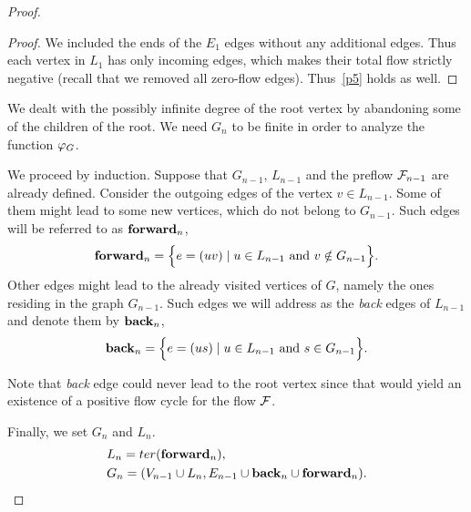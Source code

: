 \documentclass[12pt,oneside,a4paper]{amsart}
\begin{document}
\begin{proof}
\begin{proof}
          We included the ends of the $E_1$ edges without any additional edges.
          Thus each vertex in $L_1$ has only incoming edges, which makes their
            total flow strictly negative (recall that we removed all zero-flow edges).
          Thus~\ref{p5} holds as well.
        \end{proof}
        \begin{remark}
          We dealt with the possibly infinite degree of the root vertex by abandoning some of the children of the root.
          We need $G_n$ to be finite in order to analyze the function $\varphi_{G}$.
        \end{remark}

        We proceed by induction.
        Suppose that $G_{n-1}$, $L_{n-1}$ and the preflow $\mathcal{F}_{n-1}$ are already defined.
        Consider the outgoing edges of the vertex $v \in L_{n-1}$.
        Some of them might lead to some new vertices, which do not belong to $G_{n-1}$.
        Such edges will be referred to as $\mathbf{forward}_n$,
        \[
          \mathbf{forward}_n = \Big\{ e = (uv) \mid u \in L_{n-1} \text{ and } v \notin G_{n-1}\Big\}.
        \]
        Other edges might lead to the already visited vertices of $G$, namely the ones residing in the graph $G_{n-1}$.
        Such edges we will address as the \emph{back} edges of $L_{n-1}$ and denote them by $\mathbf{back}_n$,
        \[
          \mathbf{back}_n = \Big\{e = (us) \mid u \in L_{n-1} \text{ and } s \in G_{n-1}\Big\}.
        \]
        \begin{remark}
          Note that \emph{back} edge could never lead to the root vertex since that
            would yield an existence of a positive flow cycle for the flow $\mathcal{F}$.
        \end{remark}
        Finally, we set $G_n$ and $L_n$.
        \begin{align*}
          &L_n = ter(\mathbf{forward}_n),\\
          &G_n = (V_{n-1} \cup L_n, E_{n-1} \cup \mathbf{back}_n \cup \mathbf{forward}_n).
        \end{align*}

      \medskip

\end{proof}
\end{document}
